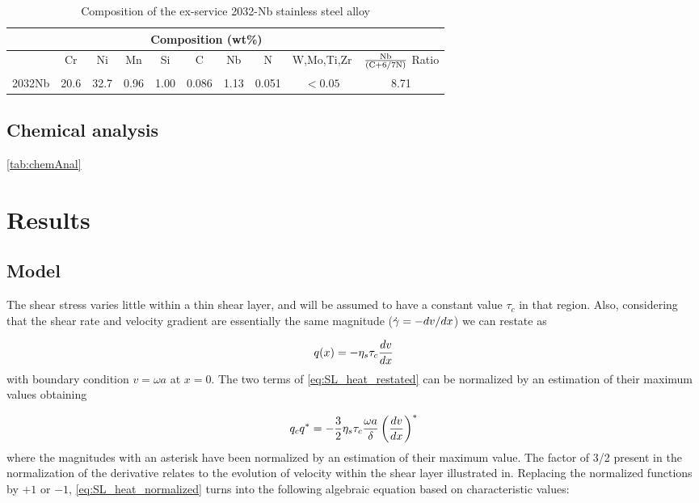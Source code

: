 \documentclass[review, 1p, number, sort&compress,table]{elsarticle}
\begin{document}
	\begin{table*}[ht!]\scriptsize
		\renewcommand{\arraystretch}{1.2}
		\centering
		\caption{Composition of the ex-service 2032-Nb stainless steel alloy}
			\begin{tabular}{lccccccccc}
			\toprule%
					& \multicolumn{8}{c}{Composition (wt\%)}              \\\hline\noalign{\smallskip}
											     						& Cr    & Ni   & Mn   & Si   & C     & Nb   & N 		& W,Mo,Ti,Zr & $\rm{\frac{Nb}{(C+6/7N)}}$ Ratio \\\hline\noalign{\smallskip}
				 	2032Nb											& 20.6  &	32.7 & 0.96 & 1.00 & 0.086 & 1.13 & 0.051 & $<0.05$  	 & 8.71 \\ \bottomrule%
			\end{tabular}
			\label{tab:chemAnal}
	\end{table*}
	  	
		\subsection{Chemical analysis}
			\autoref{tab:chemAnal}
		
  
\section{Results}\label{sec:results}
	\subsection{Model}
		The shear stress varies little within a thin shear layer, and will be assumed to have a
constant value $\tau_c$ in that region. Also, considering that the shear rate and velocity gradient are essentially the
same magnitude ($\dot\gamma=-{dv}/{dx}$) we can restate as

\begin{equation}\label{eq:SL_heat_restated}
        q(x)=-\eta_s\tau_c\frac{dv}{dx}
\end{equation}
with boundary condition $v=\omega a$ at $x=0$. The two terms of \autoref{eq:SL_heat_restated} can be normalized by
an estimation of their maximum values obtaining

\begin{equation}\label{eq:SL_heat_normalized}
            q_cq^*=-\frac 32\eta_s\tau_c\frac{\omega a}\delta\left(\frac{dv}{dx}\right)^*
\end{equation}
where the magnitudes with an asterisk have been normalized by an estimation of their maximum value. The factor of 3/2
present in the normalization of the derivative relates to the  evolution of velocity within the shear layer illustrated in. Replacing the normalized functions by $+1$ or $-1$, \autoref{eq:SL_heat_normalized} turns into the following algebraic equation based on characteristic values:
\end{document}
